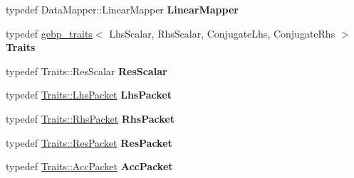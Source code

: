\begin{DoxyCompactItemize}
\item 
\mbox{\label{struct_eigen_1_1internal_1_1gebp__kernel_a012d16a8957ad24519397e9f6ed00ab5}} 
typedef Data\+Mapper\+::\+Linear\+Mapper {\bfseries Linear\+Mapper}
\item 
\mbox{\label{struct_eigen_1_1internal_1_1gebp__kernel_a6a9cda2b9874531c270a04e6832d31ff}} 
typedef \hyperlink{class_eigen_1_1internal_1_1gebp__traits}{gebp\+\_\+traits}$<$ Lhs\+Scalar, Rhs\+Scalar, Conjugate\+Lhs, Conjugate\+Rhs $>$ {\bfseries Traits}
\item 
\mbox{\label{struct_eigen_1_1internal_1_1gebp__kernel_abcd48a522e4a7a6a8a1e4445d384ae34}} 
typedef Traits\+::\+Res\+Scalar {\bfseries Res\+Scalar}
\item 
\mbox{\label{struct_eigen_1_1internal_1_1gebp__kernel_ab582b2aa13b4850eb1d2e21ffa6f5a4f}} 
typedef \hyperlink{class_eigen_1_1internal_1_1_tensor_lazy_evaluator_writable}{Traits\+::\+Lhs\+Packet} {\bfseries Lhs\+Packet}
\item 
\mbox{\label{struct_eigen_1_1internal_1_1gebp__kernel_a0173951a3e20a8831bc72928cdeadfdb}} 
typedef \hyperlink{class_eigen_1_1internal_1_1_tensor_lazy_evaluator_writable}{Traits\+::\+Rhs\+Packet} {\bfseries Rhs\+Packet}
\item 
\mbox{\label{struct_eigen_1_1internal_1_1gebp__kernel_accee30d2e60594819d6aec8194ddfa73}} 
typedef \hyperlink{class_eigen_1_1internal_1_1_tensor_lazy_evaluator_writable}{Traits\+::\+Res\+Packet} {\bfseries Res\+Packet}
\item 
\mbox{\label{struct_eigen_1_1internal_1_1gebp__kernel_ad591096b11aea803742dd4482e46961a}} 
typedef \hyperlink{class_eigen_1_1internal_1_1_tensor_lazy_evaluator_writable}{Traits\+::\+Acc\+Packet} {\bfseries Acc\+Packet}
\item 
\mbox{\label{struct_eigen_1_1internal_1_1gebp__kernel_a9793d170707e854eb15e26f27236de8d}} 

\end{DoxyCompactItemize}
